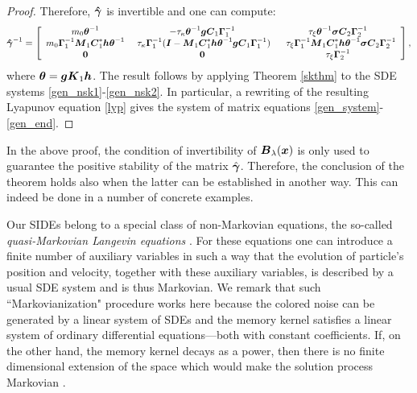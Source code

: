 \begin{proof}

Therefore,  $\boldsymbol{\hat{\gamma}}$ is invertible and one can compute:
\begin{equation}
\boldsymbol{\hat{\gamma}}^{-1} = \left[ \begin{array}{ccc}
m_0 \boldsymbol{\theta}^{-1} & -\tau_{\kappa} \boldsymbol{\theta}^{-1}\boldsymbol{g} \boldsymbol{C}_1 \boldsymbol{\Gamma}_1^{-1} & \tau_{\xi} \boldsymbol{\theta}^{-1} \boldsymbol{\sigma} \boldsymbol{C}_2 \boldsymbol{\Gamma}_2^{-1}   \\
m_{0} \boldsymbol{\Gamma}_1^{-1} \boldsymbol{M}_1 \boldsymbol{C}_1^* \boldsymbol{h} \boldsymbol{\theta}^{-1} & \  \tau_{\kappa} \boldsymbol{\Gamma}_1^{-1}(\boldsymbol{I}- \boldsymbol{M}_1 \boldsymbol{C}_1^* \boldsymbol{h}\boldsymbol{\theta}^{-1} \boldsymbol{g} \boldsymbol{C}_1 \boldsymbol{\Gamma}_1^{-1})  & \  \  \tau_{\xi}\boldsymbol{\Gamma}_1^{-1}\boldsymbol{M}_1\boldsymbol{C}_1^* \boldsymbol{h} \boldsymbol{\theta}^{-1} \boldsymbol{\sigma}\boldsymbol{C}_2 \boldsymbol{\Gamma}_2^{-1} \\ 
\boldsymbol{0}  & \boldsymbol{0}  & \tau_{\xi} \boldsymbol{\Gamma}_2^{-1} \end{array} \right],\end{equation}
where $\boldsymbol{\theta} = \boldsymbol{g} \boldsymbol{K}_1 \boldsymbol{h}$. 
The result follows by applying Theorem \ref{skthm} to the SDE systems \eqref{gen_nsk1}-\eqref{gen_nsk2}. In particular, a rewriting of the resulting Lyapunov equation \eqref{lyp} gives the system of matrix equations \eqref{gen_system}-\eqref{gen_end}.  
\end{proof}

\begin{remark} \label{role_of_gamma}
In the above proof, the condition of invertibility of $\boldsymbol{B}_\lambda(\boldsymbol{x})$ is only used to guarantee the positive stability of the matrix $\hat{\boldsymbol{\gamma}}$.  Therefore, the conclusion of the theorem holds also when the latter can be established in another way.  This can indeed be done in a number of concrete examples.  
\end{remark}


\begin{remark} \label{mark} Our SIDEs belong to a special class of non-Markovian equations, the so-called {\it quasi-Markovian Langevin equations} \cite{eckmann1999non}. For these equations one can introduce a finite number of auxiliary variables in such a way that the evolution of particle's position and velocity, together with these auxiliary variables, is described by a usual SDE system and is thus Markovian.  We remark that such ``Markovianization" procedure works here because the colored noise can be generated by a linear system of SDEs and the memory kernel satisfies a linear system of ordinary differential equations---both with constant coefficients. If, on the other hand, the memory kernel decays as a power, then there is no finite dimensional extension of the space which would make the solution process Markovian \cite{luczka2005non}. 
\end{remark}


